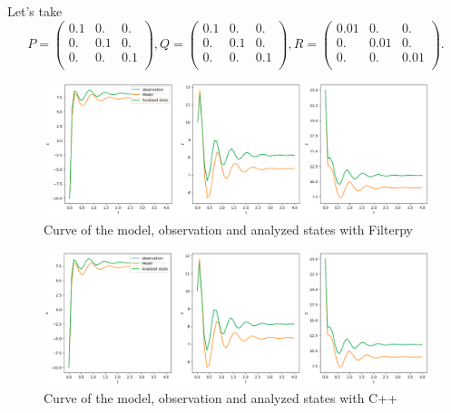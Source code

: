 \noindent\newline Let's take 
			$$P=\begin{pmatrix}
            0.1 & 0. & 0. \\
            0. & 0.1 & 0. \\
            0. & 0. & 0.1 \\
            \end{pmatrix} ,
            Q=\begin{pmatrix}
            0.1 & 0. & 0. \\
            0. & 0.1 & 0. \\
            0. & 0. & 0.1 \\
            \end{pmatrix},
            R=\begin{pmatrix}
            0.01 & 0. & 0. \\
            0. & 0.01 & 0. \\
            0. & 0. & 0.01 \\
            \end{pmatrix}.$$ 
 \begin{figure}[H]
        \centering
		\includegraphics[width=1\textwidth]{"images/enkf/result_filterpy.png"}
		\caption{Curve of the model, observation and analyzed states with Filterpy}
\end{figure}
 \begin{figure}[H]
        \centering
		\includegraphics[width=1\textwidth]{"images/enkf/result_cpp.png"}
		\caption{Curve of the model, observation and analyzed states with C++}
\end{figure}

